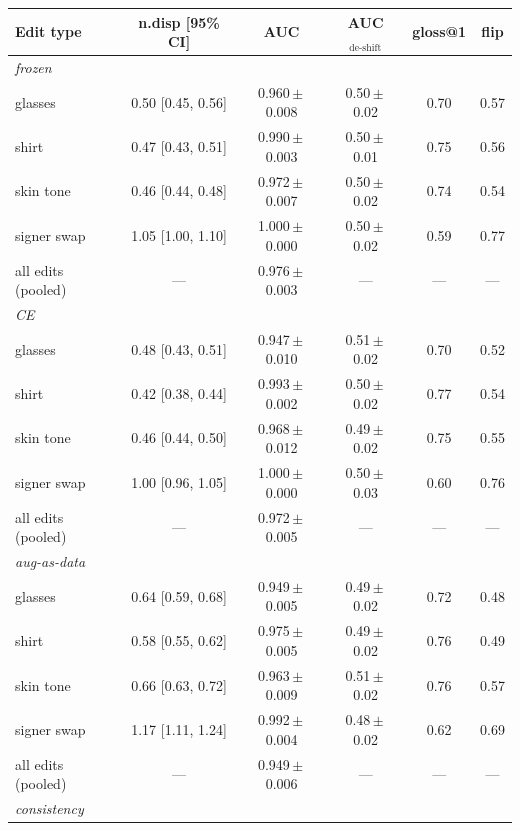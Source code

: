 \begin{table}[H]
\centering
\footnotesize
\setlength{\tabcolsep}{3.5pt}
\begin{tabular}{lccccc}
\toprule
\textbf{Edit type} & \textbf{n.disp [95\% CI]} & \textbf{AUC} & \textbf{AUC$_{\text{de-shift}}$} & \textbf{gloss@1} & \textbf{flip} \\
\midrule
\multicolumn{6}{l}{\emph{frozen}} \\
\;\;glasses & 0.50 [0.45, 0.56] & 0.960\,$\pm$\,0.008 & 0.50\,$\pm$\,0.02 & 0.70 & 0.57 \\
\;\;shirt & 0.47 [0.43, 0.51] & 0.990\,$\pm$\,0.003 & 0.50\,$\pm$\,0.01 & 0.75 & 0.56 \\
\;\;skin tone & 0.46 [0.44, 0.48] & 0.972\,$\pm$\,0.007 & 0.50\,$\pm$\,0.02 & 0.74 & 0.54 \\
\;\;signer swap & 1.05 [1.00, 1.10] & 1.000\,$\pm$\,0.000 & 0.50\,$\pm$\,0.02 & 0.59 & 0.77 \\
\;\;all edits (pooled) & --- & 0.976\,$\pm$\,0.003 & --- & --- & --- \\
\midrule
\multicolumn{6}{l}{\emph{CE}} \\
\;\;glasses & 0.48 [0.43, 0.51] & 0.947\,$\pm$\,0.010 & 0.51\,$\pm$\,0.02 & 0.70 & 0.52 \\
\;\;shirt & 0.42 [0.38, 0.44] & 0.993\,$\pm$\,0.002 & 0.50\,$\pm$\,0.02 & 0.77 & 0.54 \\
\;\;skin tone & 0.46 [0.44, 0.50] & 0.968\,$\pm$\,0.012 & 0.49\,$\pm$\,0.02 & 0.75 & 0.55 \\
\;\;signer swap & 1.00 [0.96, 1.05] & 1.000\,$\pm$\,0.000 & 0.50\,$\pm$\,0.03 & 0.60 & 0.76 \\
\;\;all edits (pooled) & --- & 0.972\,$\pm$\,0.005 & --- & --- & --- \\
\midrule
\multicolumn{6}{l}{\emph{aug-as-data}} \\
\;\;glasses & 0.64 [0.59, 0.68] & 0.949\,$\pm$\,0.005 & 0.49\,$\pm$\,0.02 & 0.72 & 0.48 \\
\;\;shirt & 0.58 [0.55, 0.62] & 0.975\,$\pm$\,0.005 & 0.49\,$\pm$\,0.02 & 0.76 & 0.49 \\
\;\;skin tone & 0.66 [0.63, 0.72] & 0.963\,$\pm$\,0.009 & 0.51\,$\pm$\,0.02 & 0.76 & 0.57 \\
\;\;signer swap & 1.17 [1.11, 1.24] & 0.992\,$\pm$\,0.004 & 0.48\,$\pm$\,0.02 & 0.62 & 0.69 \\
\;\;all edits (pooled) & --- & 0.949\,$\pm$\,0.006 & --- & --- & --- \\
\midrule
\multicolumn{6}{l}{\emph{consistency}} \\

\end{tabular}
\end{table}
